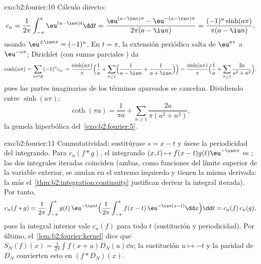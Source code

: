 \begin{solution}{exo:b2:fourier:10}
Cálculo directo:
\[
c_n = \frac{1}{2\pi}\int_{-\pi}^{\pi}\eu^{(a - \iu n)t}\dd t
= \frac{\eu^{(a-\iu n)\pi} - \eu^{-(a - \iu n)\pi}}
{2\pi(a - \iu n)}
= \frac{(-1)^n\sinh(a\pi)}{\pi(a - \iu n)} ,
\]
usando $\eu^{\pm\iu n\pi} = (-1)^n$. En $t = \pi$, la extensión
periódica salta de $\eu^{a\pi}$ a $\eu^{-a\pi}$; Dirichlet (con sumas
parciales ) da
\[
\cosh(a\pi) = \sum_{n\in\Z}(-1)^n c_n\,
= \frac{\sinh(a\pi)}{\pi}\Bigl(\frac1a +
\sum_{n\geq1}\Bigl(\frac{1}{a - \iu n} +
\frac{1}{a + \iu n}\Bigr)\Bigr)
= \frac{\sinh(a\pi)}{\pi}\Bigl(\frac1a +
\sum_{n\geq1}\frac{2a}{a^2 + n^2}\Bigr) ,
\]
pues las partes imaginarias de los términos apareados se cancelan.
Dividiendo entre $\sinh(a\pi)$:
\[
\coth(\pi a) = \frac{1}{\pi a} +
\sum_{n\geq1}\frac{2a}{\pi(a^2 + n^2)} ,
\]
la gemela hiperbólica del~\cref{exo:b2:fourier:5}.
\end{solution}

\begin{solution}{exo:b2:fourier:11}
Conmutatividad: sustitúyase $s = x - t$ y úsese la periodicidad del
integrando. Para $c_n(f * g)$, el integrando $(x, t) \mapsto
f(x-t)g(t)\eu^{-\iu nx}$ es ; las dos integrales iteradas
coinciden (ambas, como funciones del límite superior de la variable
exterior, se anulan en el extremo izquierdo y tienen la misma
derivada: la  más el~\cref{thm:b2:integration:continuity} justifican derivar la integral
iterada). Por tanto,
\[
c_n(f*g) = \frac{1}{2\pi}\int_{-\pi}^{\pi} g(t)\,\eu^{-\iu nt}
\Bigl(\frac{1}{2\pi}\int_{-\pi}^{\pi}
f(x-t)\,\eu^{-\iu n(x-t)}\dd x\Bigr)\dd t
= c_n(f)\,c_n(g),
\]
pues la integral interior vale $c_n(f)$ para todo $t$ (sustitución y
periodicidad). Por último, el~\cref{lem:b2:fourier:kernel} dice que
$S_N(f)(x) = \frac{1}{2\pi}\int f(x+u)D_N(u)\dd u$; la sustitución $u
\mapsto -t$ y la paridad de $D_N$ convierten esto en $(f * D_N)(x)$.
\end{solution}

